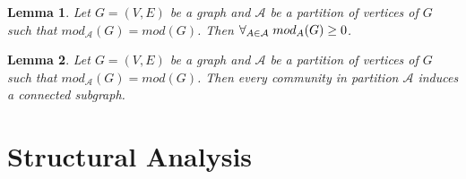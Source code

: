 \documentclass[letterpaper,12pt]{article}
\newtheorem{lemma}{Lemma}
\begin{document}
\begin{lemma}\label{positive_score}
      Let \(G = (V,E)\) be a graph and \(\mathcal{A}\) be a partition of vertices of \(G\) such that \(mod_{\mathcal{A}}(G) = mod(G)\). Then \(\forall_{A \in \mathcal{A}} \hspace{1mm} mod_A(G) \geq 0\).
\end{lemma}

\begin{lemma}\label{connected_clusters}
      Let \(G = (V,E)\) be a graph and \(\mathcal{A}\) be a partition of vertices of \(G\) such that \(mod_{\mathcal{A}}(G) = mod(G)\). Then every community in partition \(\mathcal{A}\) induces a connected subgraph.
\end{lemma}


\section{Structural Analysis}
\end{document}

